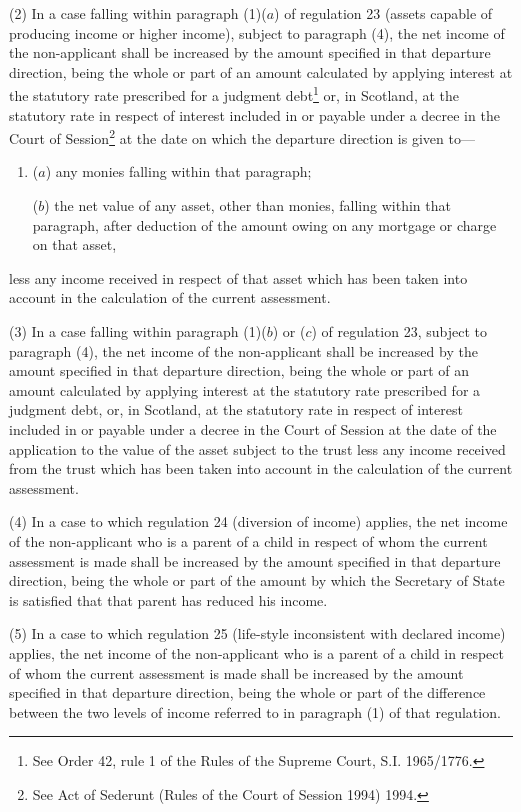 \documentclass[12pt,a4paper]{article}
\begin{document}
(2) In a case falling within paragraph (1)($a$) of regulation 23 (assets capable of producing income or higher income), subject to paragraph (4), the net income of the non-applicant shall be increased by 
the amount specified in that departure direction, being the whole or part of  %
an amount calculated by applying interest at the statutory rate prescribed for a judgment debt\footnote{\frenchspacing See Order 42, rule 1 of the Rules of the Supreme Court, S.I. 1965/1776.} or, in Scotland, at the statutory rate in respect of interest included in or payable under a decree in the Court of Session\footnote{\frenchspacing See Act of Sederunt (Rules of the Court of Session 1994) 1994.} at the date on which the departure direction is given to—
\begin{enumerate}\item[]
($a$) any monies falling within that paragraph;

($b$) the net value of any asset, other than monies, falling within that paragraph, after deduction of the amount owing on any mortgage or charge on that asset,
\end{enumerate}
less any income received in respect of that asset which has been taken into account in the calculation of the current assessment.

(3) In a case falling within paragraph (1)($b$) or ($c$) of regulation 23, subject to paragraph (4), the net income of the non-applicant shall be increased by 
the amount specified in that departure direction, being the whole or part of  %
an amount calculated by applying interest at the statutory rate prescribed for a judgment debt, or, in Scotland, at the statutory rate in respect of interest included in or payable under a decree in the Court of Session at the date of the application to the value of the asset subject to the trust less any income received from the trust which has been taken into account in the calculation of the current assessment.

(4) In a case to which regulation 24 (diversion of income) applies, the net income of the non-applicant who is a parent of a child in respect of whom the current assessment is made shall be increased by 
the amount specified in that departure direction, being the whole or part of  %
the amount by which the Secretary of State is satisfied that that parent has reduced his income.

(5) In a case to which regulation 25 (life-style inconsistent with declared income) applies, the net income of the non-applicant who is a parent of a child in respect of whom the current assessment is made shall be increased by 
the amount specified in that departure direction, being the whole or part of  %
the difference between the two levels of income referred to in paragraph (1) of that regulation.
\end{document}
